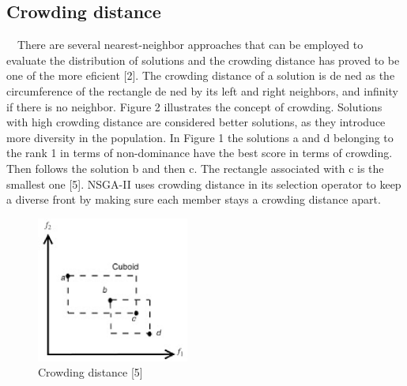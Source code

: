 \subsection[Crowding distance]{\label{identificadorReferenciaCruzada}
Crowding distance}

\ \ There are several nearest-neighbor approaches that can be employed to evaluate the distribution of solutions and the crowding distance has proved to be one of the more eficient [2]. The crowding distance of a solution is de ned as the circumference of the rectangle de ned by its left and right neighbors, and infinity if there is no neighbor. Figure 2 illustrates the concept of crowding. Solutions with high crowding distance are considered better solutions, as they introduce more diversity in the population. In Figure 1 the solutions a and d belonging to the rank 1 in terms of non-dominance have the best score in terms of crowding. Then follows the solution b and then c. The rectangle associated with c is the smallest one [5]. NSGA-II uses crowding distance in its selection operator to keep a diverse front by making sure each member stays a crowding distance apart.
\begin{figure}[h!]
\begin{center}
\includegraphics[width = 5cm] {./Graphics/Figure2.eps} 

\caption{Crowding distance [5]}
\end{center}
\end{figure}